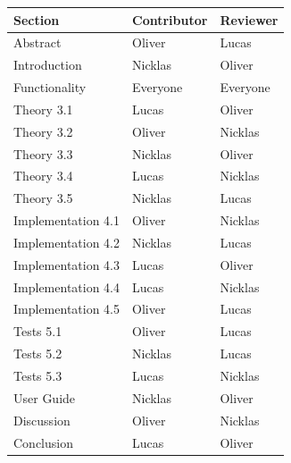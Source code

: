 \begin{table}[!htbp]
\centering
\begin{tabular}{|l|l|l|}
\hline

\textbf{Section}   & \textbf{Contributor} & \textbf{Reviewer} \\ \hline
Abstract           & Oliver               & Lucas             \\ \hline
Introduction       & Nicklas              & Oliver            \\ \hline
Functionality      & Everyone             & Everyone          \\ \hline
Theory 3.1         & Lucas                & Oliver            \\ \hline
Theory 3.2         & Oliver               & Nicklas            \\ \hline
Theory 3.3         & Nicklas              & Oliver            \\ \hline
Theory 3.4         & Lucas                & Nicklas            \\ \hline
Theory 3.5         & Nicklas              & Lucas            \\ \hline
Implementation 4.1 & Oliver               & Nicklas           \\ \hline
Implementation 4.2 & Nicklas              & Lucas             \\ \hline
Implementation 4.3 & Lucas                & Oliver            \\ \hline
Implementation 4.4 & Lucas                & Nicklas            \\ \hline
Implementation 4.5 & Oliver               & Lucas            \\ \hline
Tests 5.1          & Oliver               & Lucas             \\ \hline
Tests 5.2          & Nicklas              & Lucas             \\ \hline
Tests 5.3          & Lucas                & Nicklas           \\ \hline
User Guide         & Nicklas              & Oliver           \\ \hline
Discussion         & Oliver               & Nicklas            \\ \hline
Conclusion         & Lucas                & Oliver            \\ \hline
\end{tabular}
\end{table}


\newpage
\listoffigures
